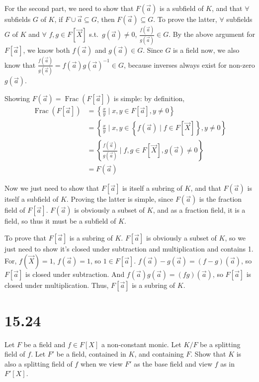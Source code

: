 \documentclass[fleqn]{article}
\DeclareMathOperator{\Frac}{Frac}
\begin{document}
        For the second part, we need to show that $F(\vec{a})$ is a subfield of $K$, and that $\forall$ subfields $G$ of $K$, if $F \cup \vec{a} \subseteq G$, then $F(\vec{a}) \subseteq G$.  To prove the latter, $\forall$ subfields $G$ of $K$ and $\forall$ $f, g \in F[\vec{X}]$ s.t.\ $g(\vec{a}) \neq 0$, $\frac{f(\vec{a})}{g(\vec{a})} \in G$.  By the above argument for $F[\vec{a}]$, we know both $f(\vec{a})$ and $g(\vec{a}) \in G$.  Since $G$ is a field now, we also know that $\frac{f(\vec{a})}{g(\vec{a})} = f(\vec{a})g(\vec{a})^{-1} \in G$, because inverses always exist for non-zero $g(\vec{a})$.
        
        Showing $F(\vec{a}) = \Frac(F[\vec{a}])$ is simple: by definition,
        \begin{align}
            \Frac(F[\vec{a}]) &= \left\{\frac{x}{y} \mid x, y \in F[\vec{a}], y \neq 0\right\} \\
                &= \left\{\frac{x}{y} \mid x, y \in \left\{f(\vec{a}) \mid f \in F[\vec{X}]\right\}, y \neq 0\right\} \\
                &= \left\{\frac{f(\vec{a})}{g(\vec{a})} \mid f, g \in F[\vec{X}], g(\vec{a}) \neq 0\right\} \\
                &= F(\vec{a})
        \end{align}
        
        Now we just need to show that $F[\vec{a}]$ is itself a subring of $K$, and that $F(\vec{a})$ is itself a subfield of $K$.  Proving the latter is simple, since $F(\vec{a})$ is the fraction field of $F[\vec{a}]$.  $F(\vec{a})$ is obviously a subset of $K$, and as a fraction field, it is a field, so thus it must be a subfield of $K$.
        
        To prove that $F[\vec{a}]$ is a subring of $K$.  $F[\vec{a}]$ is obviously a subset of $K$, so we just need to show it's closed under subtraction and multiplication and contains 1.  For, $f(\vec{X}) = 1$, $f(\vec{a}) = 1$, so $1 \in F[\vec{a}]$.  $f(\vec{a}) - g(\vec{a}) = (f - g)(\vec{a})$, so $F[\vec{a}]$ is closed under subtraction.  And $f(\vec{a})g(\vec{a}) = (fg)(\vec{a})$, so $F[\vec{a}]$ is closed under multiplication.  Thus, $F[\vec{a}]$ is a subring of $K$.
    
    \pagebreak
    
    \section{15.24}
    Let $F$ be a field and $f \in F[X]$ a non-constant monic.  Let $K/F$ be a splitting field of $f$.  Let $F'$ be a field, contained in $K$, and containing $F$.  Show that $K$ is also a splitting field of $f$ when we view $F'$ as the base field and view $f$ as in $F'[X]$.
    
\end{document}
